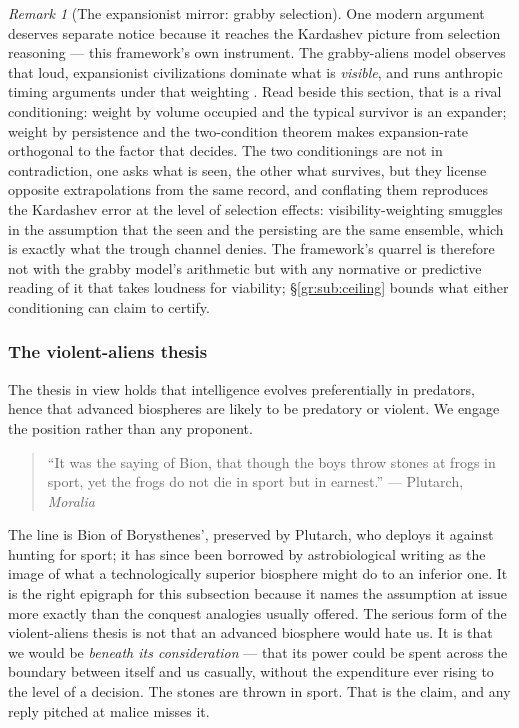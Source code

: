 \documentclass[11pt]{article}
\numberwithin{equation}{section}
\theoremstyle{plain}
\theoremstyle{definition}
\theoremstyle{remark}
\newtheorem{remark}[theorem]{Remark}
\begin{document}
\begin{remark}[The expansionist mirror: grabby selection]
\label{gr:rem:grabby}
One modern argument deserves separate notice because it reaches the
Kardashev picture from selection reasoning --- this framework's own
instrument. The grabby-aliens model observes that loud, expansionist
civilizations dominate what is \emph{visible}, and runs anthropic
timing arguments under that weighting \cite{HMMP21}. Read beside this
section, that is a rival conditioning: weight by volume occupied and
the typical survivor is an expander; weight by persistence and the
two-condition theorem makes expansion-rate orthogonal to the factor
that decides. The two conditionings are not in contradiction, one
asks what is seen, the other what survives, but they license
opposite extrapolations from the same record, and conflating them
reproduces the Kardashev error at the level of selection effects:
visibility-weighting smuggles in the assumption that the seen and the
persisting are the same ensemble, which is exactly what the trough
channel denies. The framework's quarrel is therefore not with the
grabby model's arithmetic but with any normative or predictive reading
of it that takes loudness for viability; \S\ref{gr:sub:ceiling} bounds
what either conditioning can claim to certify.
\end{remark}

\subsubsection{The violent-aliens thesis}\label{gr:subsub:violence}

The thesis in view holds that intelligence evolves preferentially in
predators, hence that advanced biospheres are likely to be predatory or
violent. We engage the position rather than any proponent.

\begin{quote}\small
``It was the saying of Bion, that though the boys throw stones at frogs
in sport, yet the frogs do not die in sport but in earnest.''
\hfill --- Plutarch, \emph{Moralia} \cite{Plutarch}
\end{quote}

\noindent The line is Bion of Borysthenes', preserved by Plutarch, who
deploys it against hunting for sport; it has since been borrowed by
astrobiological writing as the image of what a technologically superior
biosphere might do to an inferior one. It is the right epigraph for this
subsection because it names the assumption at issue more exactly than
the conquest analogies usually offered. The serious form of the
violent-aliens thesis is not that an advanced biosphere would hate us.
It is that we would be \emph{beneath its consideration} --- that its
power could be spent across the boundary between itself and us
casually, without the expenditure ever rising to the level of a
decision. The stones are thrown in sport. That is the claim, and any
reply pitched at malice misses it.
\end{document}
